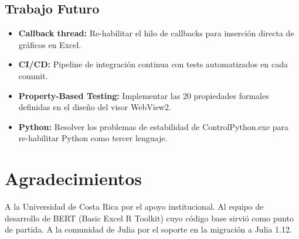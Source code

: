 \documentclass[12pt, a4paper]{report}
\begin{document}
\section{Trabajo Futuro}

\begin{itemize}
    \item \textbf{Callback thread:} Re-habilitar el hilo de callbacks para inserción directa de gráficos en Excel.
    \item \textbf{CI/CD:} Pipeline de integración continua con tests automatizados en cada commit.
    \item \textbf{Property-Based Testing:} Implementar las 20 propiedades formales definidas en el diseño del visor WebView2.
    \item \textbf{Python:} Resolver los problemas de estabilidad de ControlPython.exe para re-habilitar Python como tercer lenguaje.
\end{itemize}

\chapter*{Agradecimientos}

A la Universidad de Costa Rica por el apoyo institucional. Al equipo de desarrollo de BERT (Basic Excel R Toolkit) cuyo código base sirvió como punto de partida. A la comunidad de Julia por el soporte en la migración a Julia 1.12.
\end{document}

